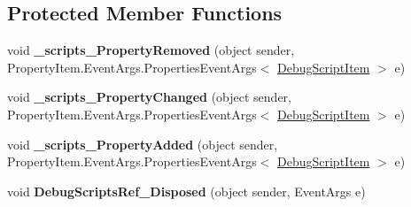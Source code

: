 \subsection*{Protected Member Functions}
\begin{DoxyCompactItemize}
\item 
\hypertarget{classlib_watcher_dialog_1_1_debug_scripts_ref_a4587bc4dbf4443cbdf96cbf7e32d7ce5}{void {\bfseries \+\_\+scripts\+\_\+\+Property\+Removed} (object sender, Property\+Item.\+Event\+Args.\+Properties\+Event\+Args$<$ \hyperlink{classlib_watcher_dialog_1_1_property_item_1_1_debug_script_1_1_debug_script_item}{Debug\+Script\+Item} $>$ e)}\label{classlib_watcher_dialog_1_1_debug_scripts_ref_a4587bc4dbf4443cbdf96cbf7e32d7ce5}

\item 
\hypertarget{classlib_watcher_dialog_1_1_debug_scripts_ref_a64268eff9f427fc172b6fd2eccb2ab54}{void {\bfseries \+\_\+scripts\+\_\+\+Property\+Changed} (object sender, Property\+Item.\+Event\+Args.\+Properties\+Event\+Args$<$ \hyperlink{classlib_watcher_dialog_1_1_property_item_1_1_debug_script_1_1_debug_script_item}{Debug\+Script\+Item} $>$ e)}\label{classlib_watcher_dialog_1_1_debug_scripts_ref_a64268eff9f427fc172b6fd2eccb2ab54}

\item 
\hypertarget{classlib_watcher_dialog_1_1_debug_scripts_ref_a5b5d35a539ece00e7301b5b79cd706f0}{void {\bfseries \+\_\+scripts\+\_\+\+Property\+Added} (object sender, Property\+Item.\+Event\+Args.\+Properties\+Event\+Args$<$ \hyperlink{classlib_watcher_dialog_1_1_property_item_1_1_debug_script_1_1_debug_script_item}{Debug\+Script\+Item} $>$ e)}\label{classlib_watcher_dialog_1_1_debug_scripts_ref_a5b5d35a539ece00e7301b5b79cd706f0}

\item 
\hypertarget{classlib_watcher_dialog_1_1_debug_scripts_ref_ae6a9b7a5b85b6f1f4d10c3f0cc578038}{void {\bfseries Debug\+Scripts\+Ref\+\_\+\+Disposed} (object sender, Event\+Args e)}\label{classlib_watcher_dialog_1_1_debug_scripts_ref_ae6a9b7a5b85b6f1f4d10c3f0cc578038}

\end{DoxyCompactItemize}
